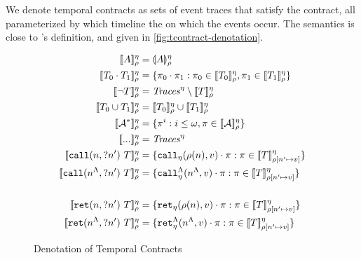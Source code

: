 \documentclass[preprint,onecolumn,9pt]{sigplanconf} %
\begin{document}
We denote temporal contracts as sets of event traces that satisfy the contract, all parameterized by which timeline the on which the events occur.
%
The semantics is close to \citeauthor{ianjohnson:dfm:icfp2011}'s definition, and given in \autoref{fig:tcontract-denotation}.
%
\begin{figure}
  \begin{align*}
   \denotetcon{\mevent}{\mtimeline}{\menv} &=
   \denoteevent{\mevent}{\menv}{\mtimeline}
\\
   \denotetcon{\stseq{\mtcon_0}{\mtcon_1}}{\mtimeline}{\menv} &=
   \setbuild{\mtrace_0 \cdot \mtrace_1}{\mtrace_0 \in \denotetcon{\mtcon_0}{\mtimeline}{\menv}, \mtrace_1 \in \denotetcon{\mtcon_1}{\mtimeline}{\menv}}
\\   
   \denotetcon{\stnot{\mtcon}}{\mtimeline}{\menv} &=
   \Traces^\mtimeline \setminus \denotetcon{\mtcon}{\mtimeline}{\menv}
\\
   \denotetcon{\stOr{\mtcon_0}{\mtcon_1}}{\mtimeline}{\menv} &=
   \denotetcon{\mtcon_0}{\mtimeline}{\menv} \cup \denotetcon{\mtcon_1}{\mtimeline}{\menv}
\\
   \denotetcon{\stmany{\mtconNoB}}{\mtimeline}{\menv} &=
   \setbuild{\mtrace^i}{i \le \omega, \mtrace \in \denotetcon{\mtconNoB}{\mtimeline}{\menv}}
\\
   \denotetcon{\sddd}{\mtimeline}{\menv} &=
   \Traces^\mtimeline
\\
   \denotetcon{\stcall{\mname}{\mname'}{\mtcon}}{\mtimeline}{\menv} &=
   \setbuild{\apvcall{\menv(\mname)}{\mval}{\mtimeline}\cdot \mtrace}{\mtrace \in \denotetcon{\mtcon}{\mtimeline}{\menv[\mname' \mapsto \mval]}}
\\
   \denotetcon{\stcall{\mtoplevelname}{\mname'}{\mtcon}}{\mtimeline}{\menv} &=
   \setbuild{\aptopcall{\mtoplevelname}{\mval}{\mtimeline}\cdot \mtrace}{\mtrace \in \denotetcon{\mtcon}{\mtimeline}{\menv[\mname' \mapsto \mval]}}
\\
\\
   \denotetcon{\stret{\mname}{\mname'}{\mtcon}}{\mtimeline}{\menv} &=
   \setbuild{\apvret{\menv(\mname)}{\mval}{\mtimeline}\cdot \mtrace}{\mtrace \in \denotetcon{\mtcon}{\mtimeline}{\menv[\mname' \mapsto \mval]}}
\\
   \denotetcon{\stret{\mtoplevelname}{\mname'}{\mtcon}}{\mtimeline}{\menv} &=
   \setbuild{\aptopret{\mtoplevelname}{\mval}{\mtimeline}\cdot \mtrace}{\mtrace \in \denotetcon{\mtcon}{\mtimeline}{\menv[\mname' \mapsto \mval]}}
  \end{align*}
  \caption{Denotation of Temporal Contracts}
  \label{fig:tcontract-denotation}
\end{figure}
\end{document}
